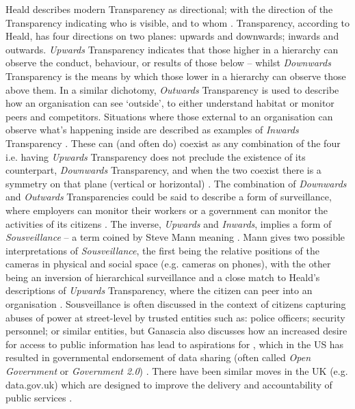 %
%
Heald describes modern Transparency as directional; with the direction of the Transparency indicating who is visible, and to whom \cite{heald_varieties_2006}. Transparency, according to Heald, has four directions on two planes: upwards and downwards; inwards and outwards. \textit{Upwards} Transparency indicates that those higher in a hierarchy can observe the conduct, behaviour, or results of those below -- whilst \textit{Downwards} Transparency is the means by which those lower in a hierarchy can observe those above them. In a similar dichotomy, \textit{Outwards} Transparency is used to describe how an organisation can see `outside', to either understand habitat or monitor peers and competitors. Situations where those external to an organisation can observe what's happening inside are described as examples of \textit{Inwards} Transparency \cite{heald_varieties_2006}. These can (and often do) coexist as any combination of the four i.e. having \textit{Upwards} Transparency does not preclude the existence of its counterpart, \textit{Downwards} Transparency, and when the two coexist there is a symmetry on that plane (vertical or horizontal) \cite{heald_varieties_2006}.
%
The combination of \textit{Downwards} and \textit{Outwards} Transparencies could be said to describe a form of surveillance, where employers can monitor their workers or a government can monitor the activities of its citizens \cite{heald_varieties_2006}. The inverse, \textit{Upwards} and \textit{Inwards}, implies a form of \textit{Sousveillance} -- a term coined by Steve Mann meaning  \cite{mann_sousveillance:_2004}. Mann gives two possible interpretations of \textit{Sousveillance}, the first being the relative positions of the cameras in physical and social space (e.g. cameras on phones), with the other being an inversion of hierarchical surveillance and a close match to Heald's descriptions of \textit{Upwards} Transparency, where the citizen can peer into an organisation \cite{mann_sousveillance:_2004, heald_varieties_2006}. Sousveillance is often discussed in the context of citizens capturing abuses of power at street-level by trusted entities such as: police officers; security personnel; or similar entities, but Ganascia also discusses how an increased desire for access to public information has lead to aspirations for , which in the US has resulted in governmental endorsement of data sharing (often called \textit{Open Government} or \textit{Government 2.0}) \cite{ganascia_generalized_2010}. There have been similar moves in the UK (e.g. data.gov.uk) which are designed to improve the delivery and accountability of public services \cite{shadbolt_linked_2012}.
